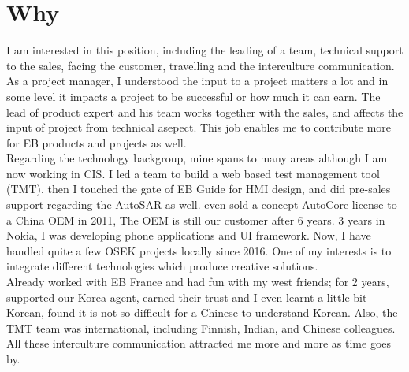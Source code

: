 \section{Why}
I am interested in this position,
including the leading of a team,
technical support to the sales,
facing the customer,
travelling and the interculture communication.
As a project manager,
I understood the input to a project matters a lot
and in some level it impacts a project to be successful or how much it can earn.
The lead of product expert and his team works together with the sales,
and affects the input of project from technical asepect.
This job enables me to contribute more for EB products
and projects as well.
\\
Regarding the technology backgroup,
mine spans to many areas although I am now working in CIS.
I led a team to build a web based test management tool (TMT),
then I touched the gate of EB Guide for HMI design,
and did pre-sales support regarding the AutoSAR as well.
even sold a concept AutoCore license to a China OEM in 2011,
The OEM is still our customer after 6 years.
3 years in Nokia, I was developing phone applications
and UI framework.
Now, I have handled quite a few OSEK projects locally since 2016.
One of my interests is to integrate different technologies
which produce creative solutions.
\\
Already worked with EB France and had fun with my west friends;
for 2 years, supported our Korea agent,
earned their trust and I even learnt a little bit Korean,
found it is not so difficult for a Chinese to understand Korean.
Also, the TMT team was international, including Finnish, Indian, and Chinese colleagues.
All these interculture communication attracted me more and more as time goes by.
